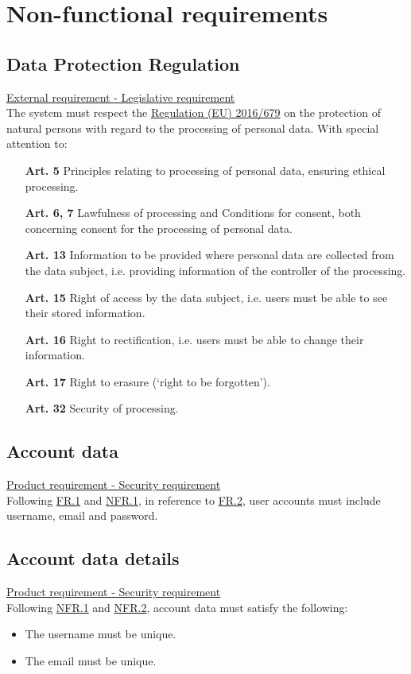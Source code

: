 \documentclass[12pt]{article}
\renewcommand\bf[1]{\textbf{#1}}
\newcommand\un[1]{\underline{#1}}
\newcommand\hyl[1]{\hyperref[#1]{#1}}
\newcommand\subs[2]{\subsection{#1}\label{#2}}
\begin{document}
\section{Non-functional requirements}

\subs{Data Protection Regulation}{NFR.1}
\un{External requirement - Legislative requirement} \\

\noindent The system must respect the \href{https://eur-lex.europa.eu/legal-content/EN/TXT/?uri=CELEX%3A02016R0679-20160504&qid=1532348683434}
{Regulation (EU) 2016/679} on the protection of natural persons with regard to the processing of personal data. 
With special attention to:
\begin{itemize}
	\item[\bf{Art. 5}] Principles relating to processing of personal data, ensuring ethical processing.
	\item[\bf{Art. 6, 7}] Lawfulness of processing and Conditions for consent, both concerning consent for the processing 
	of personal data.
	\item[\bf{Art. 13}] Information to be provided where personal data are collected from the data subject, 
	i.e. providing information of the controller of the processing.
	\item[\bf{Art. 15}] Right of access by the data subject, i.e. users must be able to see their stored information.
	\item[\bf{Art. 16}] Right to rectification, i.e. users must be able to change their information.
	\item[\bf{Art. 17}] Right to erasure (‘right to be forgotten’).
	\item[\bf{Art. 32}] Security of processing.
\end{itemize}

\subs{Account data}{NFR.2}
\un{Product requirement - Security requirement} \\

\noindent Following \hyl{FR.1} and \hyl{NFR.1}, in reference to \hyl{FR.2}, user accounts must include username, email and 
password.

\subs{Account data details}{NFR.3}
\un{Product requirement - Security requirement} \\

\noindent Following \hyl{NFR.1} and \hyl{NFR.2}, account data must satisfy the following:
\begin{itemize}
	\item The username must be unique.
	\item The email must be unique.
\end{itemize}
\end{document}
